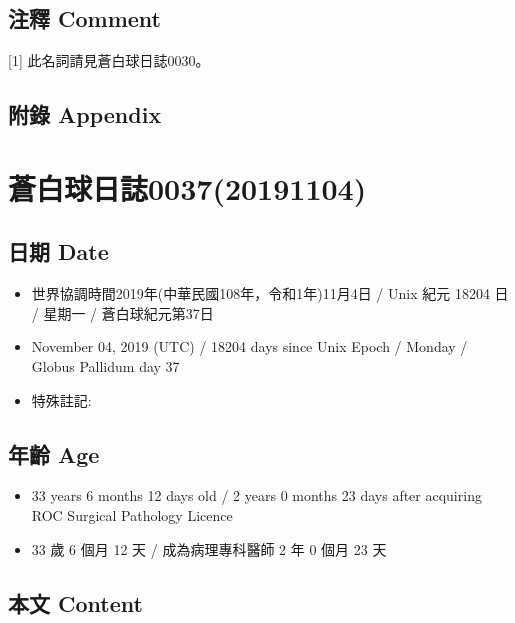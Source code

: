 \documentclass[a5paper, 12pt
]{book}
\providecommand{\tightlist}{%
  \setlength{\itemsep}{0pt}\setlength{\parskip}{0pt}}
\begin{document}
\hypertarget{ux6ce8ux91cb-comment-29}{%
\subsection{注釋 Comment}\label{ux6ce8ux91cb-comment-29}}

{[}1{]} 此名詞請見蒼白球日誌0030。

\hypertarget{ux9644ux9304-appendix-28}{%
\subsection{附錄 Appendix}\label{ux9644ux9304-appendix-28}}

\hypertarget{ux84bcux767dux7403ux65e5ux8a8c003720191104}{%
\section{蒼白球日誌0037(20191104)}\label{ux84bcux767dux7403ux65e5ux8a8c003720191104}}

\hypertarget{ux65e5ux671f-date-36}{%
\subsection{日期 Date}\label{ux65e5ux671f-date-36}}

\begin{itemize}
\tightlist
\item
  世界協調時間2019年(中華民國108年，令和1年)11月4日 / Unix 紀元 18204 日
  / 星期一 / 蒼白球紀元第37日
\item
  November 04, 2019 (UTC) / 18204 days since Unix Epoch / Monday /
  Globus Pallidum day 37
\item
  特殊註記:
\end{itemize}

\hypertarget{ux5e74ux9f61-age-36}{%
\subsection{年齡 Age}\label{ux5e74ux9f61-age-36}}

\begin{itemize}
\tightlist
\item
  33 years 6 months 12 days old / 2 years 0 months 23 days after
  acquiring ROC Surgical Pathology Licence
\item
  33 歲 6 個月 12 天 / 成為病理專科醫師 2 年 0 個月 23 天
\end{itemize}

\hypertarget{ux672cux6587-content-36}{%
\subsection{本文 Content}\label{ux672cux6587-content-36}}
\end{document}
